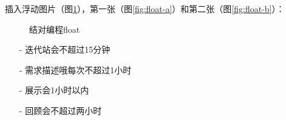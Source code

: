 \documentclass[UTF8,a4paper,12pt]{ctexart}
\newcommand{\reffig}[1]{（图\ref{#1}）}
\begin{document}
 插入浮动图片\reffig{fig:pair-float}，第一张\reffig{fig:float-a}和第二张\reffig{fig:float-b}：
 
  \begin{figure}[htbp]
  \quad
  \quad
  \caption{结对编程float}
  \label{fig:pair-float}
  \end{figure}
  
  \begin{itemize}
  	\setlength{\itemsep}{0pt}
  	\setlength{\parsep}{0pt}
  	\setlength{\parskip}{0pt}
  	\item[-] 迭代站会不超过15分钟
  	\item[-] 需求描述哦每次不超过1小时
  	\item[-] 展示会1小时以内
  	\item[-] 回顾会不超过两小时
  \end{itemize}
 
\renewcommand\refname{参考文献}
\nocite{*} %
\printbibliography
\end{document}

